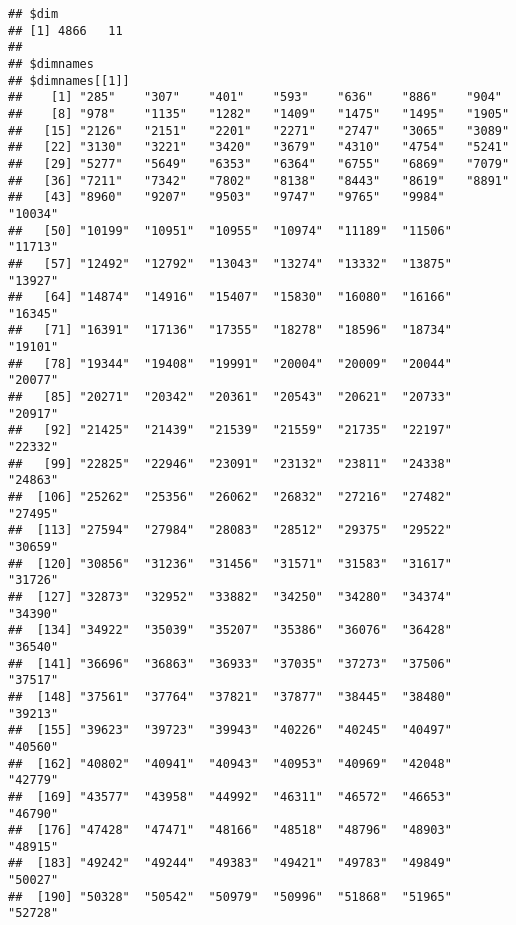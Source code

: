 \documentclass[]{article}
\newenvironment{Shaded}{\begin{snugshade}}{\end{snugshade}}
\newcommand{\KeywordTok}[1]{\textcolor[rgb]{0.13,0.29,0.53}{\textbf{{#1}}}}
\newcommand{\DataTypeTok}[1]{\textcolor[rgb]{0.13,0.29,0.53}{{#1}}}
\newcommand{\DecValTok}[1]{\textcolor[rgb]{0.00,0.00,0.81}{{#1}}}
\newcommand{\StringTok}[1]{\textcolor[rgb]{0.31,0.60,0.02}{{#1}}}
\newcommand{\NormalTok}[1]{{#1}}
\begin{document}
\begin{Shaded}
\end{Shaded}

\begin{verbatim}
## $dim
## [1] 4866   11
## 
## $dimnames
## $dimnames[[1]]
##    [1] "285"    "307"    "401"    "593"    "636"    "886"    "904"   
##    [8] "978"    "1135"   "1282"   "1409"   "1475"   "1495"   "1905"  
##   [15] "2126"   "2151"   "2201"   "2271"   "2747"   "3065"   "3089"  
##   [22] "3130"   "3221"   "3420"   "3679"   "4310"   "4754"   "5241"  
##   [29] "5277"   "5649"   "6353"   "6364"   "6755"   "6869"   "7079"  
##   [36] "7211"   "7342"   "7802"   "8138"   "8443"   "8619"   "8891"  
##   [43] "8960"   "9207"   "9503"   "9747"   "9765"   "9984"   "10034" 
##   [50] "10199"  "10951"  "10955"  "10974"  "11189"  "11506"  "11713" 
##   [57] "12492"  "12792"  "13043"  "13274"  "13332"  "13875"  "13927" 
##   [64] "14874"  "14916"  "15407"  "15830"  "16080"  "16166"  "16345" 
##   [71] "16391"  "17136"  "17355"  "18278"  "18596"  "18734"  "19101" 
##   [78] "19344"  "19408"  "19991"  "20004"  "20009"  "20044"  "20077" 
##   [85] "20271"  "20342"  "20361"  "20543"  "20621"  "20733"  "20917" 
##   [92] "21425"  "21439"  "21539"  "21559"  "21735"  "22197"  "22332" 
##   [99] "22825"  "22946"  "23091"  "23132"  "23811"  "24338"  "24863" 
##  [106] "25262"  "25356"  "26062"  "26832"  "27216"  "27482"  "27495" 
##  [113] "27594"  "27984"  "28083"  "28512"  "29375"  "29522"  "30659" 
##  [120] "30856"  "31236"  "31456"  "31571"  "31583"  "31617"  "31726" 
##  [127] "32873"  "32952"  "33882"  "34250"  "34280"  "34374"  "34390" 
##  [134] "34922"  "35039"  "35207"  "35386"  "36076"  "36428"  "36540" 
##  [141] "36696"  "36863"  "36933"  "37035"  "37273"  "37506"  "37517" 
##  [148] "37561"  "37764"  "37821"  "37877"  "38445"  "38480"  "39213" 
##  [155] "39623"  "39723"  "39943"  "40226"  "40245"  "40497"  "40560" 
##  [162] "40802"  "40941"  "40943"  "40953"  "40969"  "42048"  "42779" 
##  [169] "43577"  "43958"  "44992"  "46311"  "46572"  "46653"  "46790" 
##  [176] "47428"  "47471"  "48166"  "48518"  "48796"  "48903"  "48915" 
##  [183] "49242"  "49244"  "49383"  "49421"  "49783"  "49849"  "50027" 
##  [190] "50328"  "50542"  "50979"  "50996"  "51868"  "51965"  "52728" 

\end{verbatim}
\end{document}
